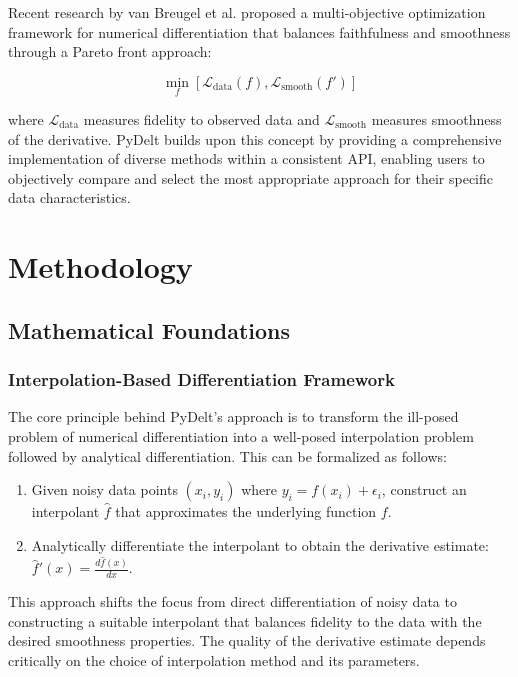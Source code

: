 \documentclass[10pt,journal,compsoc]{IEEEtran}
\begin{document}
Recent research by van Breugel et al. \cite{van2021numerical} proposed a multi-objective optimization framework for numerical differentiation that balances faithfulness and smoothness through a Pareto front approach:

\begin{equation}
    \min_{f} \left[ \mathcal{L}_{\text{data}}(f), \mathcal{L}_{\text{smooth}}(f') \right]
\end{equation}

where $\mathcal{L}_{\text{data}}$ measures fidelity to observed data and $\mathcal{L}_{\text{smooth}}$ measures smoothness of the derivative. PyDelt builds upon this concept by providing a comprehensive implementation of diverse methods within a consistent API, enabling users to objectively compare and select the most appropriate approach for their specific data characteristics.

\section{Methodology}

\subsection{Mathematical Foundations}

\subsubsection{Interpolation-Based Differentiation Framework}

The core principle behind PyDelt's approach is to transform the ill-posed problem of numerical differentiation into a well-posed interpolation problem followed by analytical differentiation. This can be formalized as follows:

\begin{enumerate}
    \item Given noisy data points $(x_i, y_i)$ where $y_i = f(x_i) + \epsilon_i$, construct an interpolant $\hat{f}$ that approximates the underlying function $f$.
    
    \item Analytically differentiate the interpolant to obtain the derivative estimate: $\hat{f}'(x) = \frac{d\hat{f}(x)}{dx}$.
\end{enumerate}

This approach shifts the focus from direct differentiation of noisy data to constructing a suitable interpolant that balances fidelity to the data with the desired smoothness properties. The quality of the derivative estimate depends critically on the choice of interpolation method and its parameters.
\end{document}
